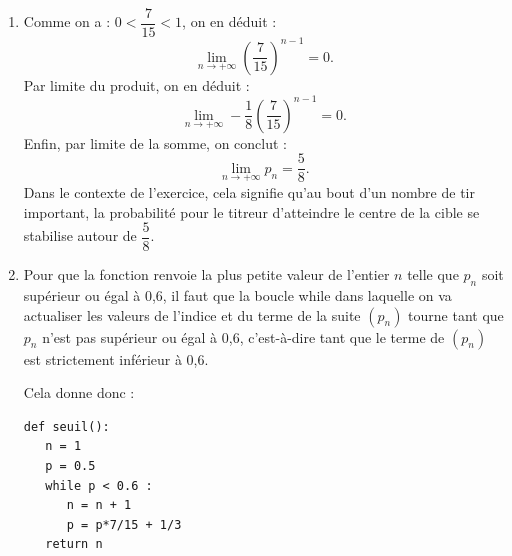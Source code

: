 \begin{enumerate}
\begin{enumerate}
\item En partant de la définition de la suite $(u_n)$, pour un entier $n$ naturel non nul, on a :
\[
\begin{aligned}
u_n=p_n-\dfrac58&\Longleftrightarrow p_n=\dfrac58+u_n\\
&\Longleftrightarrow p_n=\dfrac58-\dfrac18\left(\dfrac7{15}\right)^{n-1}.
\end{aligned}
\]
\end{enumerate}

\item Comme on a : $0<\dfrac7{15}<1$, on en déduit :
\[
\lim_{n\to +\infty}\left(\dfrac7{15}\right)^{n-1}=0.
\]
Par limite du produit, on en déduit :
\[
\lim_{n\to +\infty}-\dfrac18\left(\dfrac7{15}\right)^{n-1}=0.
\]
Enfin, par limite de la somme, on conclut :
\[
\lim_{n\to +\infty}p_n=\dfrac58.
\]
Dans le contexte de l'exercice, cela signifie qu'au bout d'un nombre de tir important, la probabilité pour le titreur d'atteindre le centre de la cible se stabilise autour de $\dfrac58$.

\item Pour que la fonction renvoie la plus petite valeur de l'entier $n$ telle que $p_n$ soit supérieur ou égal à 0,6, il faut que la boucle while dans laquelle on va actualiser les valeurs de l'indice et du terme de la suite $(p_n)$ tourne tant que $p_n$ n'est pas supérieur ou égal à 0,6, c'est-à-dire tant que le terme de $(p_n)$ est strictement inférieur à 0,6.

Cela donne donc :

\begin{minipage}{0.4\linewidth}\begin{lstlisting}[style=python]
def seuil():
   n = 1
   p = 0.5
   while p < 0.6 :
      n = n + 1
      p = p*7/15 + 1/3
   return n
\end{lstlisting}\end{minipage}


\end{enumerate}
